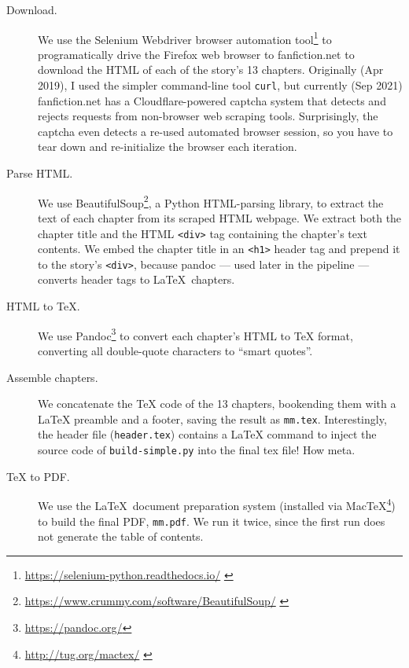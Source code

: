 \documentclass[ebook,12pt]{memoir}
\begin{document}
\begin{description}

\item[Download.] We use the Selenium Webdriver browser automation tool\footnote{
    \tiny{ \url{https://selenium-python.readthedocs.io/} }
} to programatically drive the Firefox web browser to fanfiction.net to
download the HTML of each of the story's 13 chapters. Originally (Apr 2019),
I used the simpler command-line tool \texttt{curl}, but currently (Sep 2021) fanfiction.net
has a Cloudflare-powered captcha system that detects and rejects requests from non-browser web scraping tools.
Surprisingly, the captcha even detects a re-used automated browser session,
so you have to tear down and re-initialize the browser each iteration.

\item[Parse HTML.] We use BeautifulSoup\footnote{
    \tiny{ \url{https://www.crummy.com/software/BeautifulSoup/} }
}, a Python HTML-parsing library,
to extract the text of each chapter from its scraped HTML webpage.
We extract both the chapter title and the HTML \texttt{<div>} tag containing
the chapter's text contents. We embed the chapter title in an \texttt{<h1>} header tag
and prepend it to the story's \texttt{<div>}, because pandoc --- used later in the pipeline ---
converts header tags to \LaTeX\ chapters. 

\item[HTML to TeX.] We use Pandoc\footnote{\tiny{\url{https://pandoc.org/}}} to convert
each chapter's HTML to TeX format, converting all double-quote characters to ``smart quotes''.

\item[Assemble chapters.] We concatenate the TeX code of the 13 chapters, bookending them with a
LaTeX preamble and a footer, saving the result as \texttt{mm.tex}. Interestingly, the header file (\texttt{header.tex})
contains a LaTeX command to inject the source code of \texttt{build-simple.py} into the final tex file! How meta.

\item[TeX to PDF.] We use the \LaTeX\ document preparation system (installed via MacTeX\footnote{
    \tiny{ \url{http://tug.org/mactex/} }
}) to build the final PDF, \texttt{mm.pdf}. We run it twice, since the first run does not
generate the table of contents.

\end{description}


\normalsize
\cleartorecto
\end{document}
